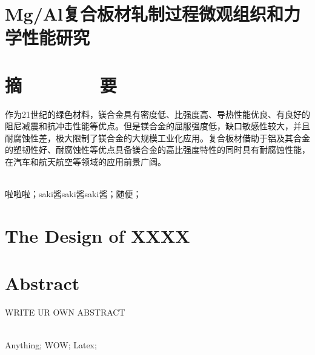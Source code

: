 \section*{\heiti Mg/Al复合板材轧制过程微观组织和力学性能研究}
\section*{\heiti 摘\ \ \ \ \ \ \ \ 要}

作为21世纪的绿色材料，镁合金具有密度低、比强度高、导热性能优良、有良好的阻尼减震和抗冲击性能等优点。但是镁合金的屈服强度低，缺口敏感性较大，并且耐腐蚀性差，极大限制了镁合金的大规模工业化应用。复合板材借助于铝及其合金的塑韧性好、耐腐蚀性等优点具备镁合金的高比强度特性的同时具有耐腐蚀性能，在汽车和航天航空等领域的应用前景广阔。\par
\leavevmode %
\\ %
啦啦啦；saki酱saki酱saki酱；随便；

\clearpage


\section*{\bfseries The Design of XXXX}



\section*{\bfseries Abstract}

WRITE UR OWN ABSTRACT \par
\leavevmode %
\\ %
Anything; WOW; Latex;

\cleardoublepage




